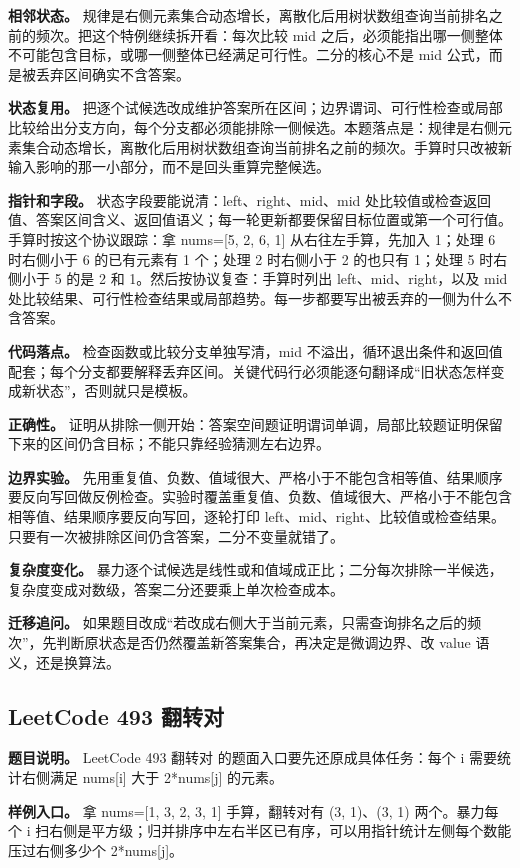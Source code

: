 \textbf{相邻状态。} 规律是右侧元素集合动态增长，离散化后用树状数组查询当前排名之前的频次。把这个特例继续拆开看：每次比较 mid 之后，必须能指出哪一侧整体不可能包含目标，或哪一侧整体已经满足可行性。二分的核心不是 mid 公式，而是被丢弃区间确实不含答案。

\textbf{状态复用。} 把逐个试候选改成维护答案所在区间；边界谓词、可行性检查或局部比较给出分支方向，每个分支都必须能排除一侧候选。本题落点是：规律是右侧元素集合动态增长，离散化后用树状数组查询当前排名之前的频次。手算时只改被新输入影响的那一小部分，而不是回头重算完整候选。

\textbf{指针和字段。} 状态字段要能说清：left、right、mid、mid 处比较值或检查返回值、答案区间含义、返回值语义；每一轮更新都要保留目标位置或第一个可行值。手算时按这个协议跟踪：拿 nums=[5, 2, 6, 1] 从右往左手算，先加入 1；处理 6 时右侧小于 6 的已有元素有 1 个；处理 2 时右侧小于 2 的也只有 1；处理 5 时右侧小于 5 的是 2 和 1。然后按协议复查：手算时列出 left、mid、right，以及 mid 处比较结果、可行性检查结果或局部趋势。每一步都要写出被丢弃的一侧为什么不含答案。

\textbf{代码落点。} 检查函数或比较分支单独写清，mid 不溢出，循环退出条件和返回值配套；每个分支都要解释丢弃区间。关键代码行必须能逐句翻译成“旧状态怎样变成新状态”，否则就只是模板。

\textbf{正确性。} 证明从排除一侧开始：答案空间题证明谓词单调，局部比较题证明保留下来的区间仍含目标；不能只靠经验猜测左右边界。

\textbf{边界实验。} 先用重复值、负数、值域很大、严格小于不能包含相等值、结果顺序要反向写回做反例检查。实验时覆盖重复值、负数、值域很大、严格小于不能包含相等值、结果顺序要反向写回，逐轮打印 left、mid、right、比较值或检查结果。只要有一次被排除区间仍含答案，二分不变量就错了。

\textbf{复杂度变化。} 暴力逐个试候选是线性或和值域成正比；二分每次排除一半候选，复杂度变成对数级，答案二分还要乘上单次检查成本。

\textbf{迁移追问。} 如果题目改成“若改成右侧大于当前元素，只需查询排名之后的频次”，先判断原状态是否仍然覆盖新答案集合，再决定是微调边界、改 value 语义，还是换算法。

\subsection{LeetCode 493 翻转对}

\textbf{题目说明。} LeetCode 493 翻转对 的题面入口要先还原成具体任务：每个 i 需要统计右侧满足 nums[i] 大于 2*nums[j] 的元素。

\textbf{样例入口。} 拿 nums=[1, 3, 2, 3, 1] 手算，翻转对有 (3, 1)、(3, 1) 两个。暴力每个 i 扫右侧是平方级；归并排序中左右半区已有序，可以用指针统计左侧每个数能压过右侧多少个 2*nums[j]。

